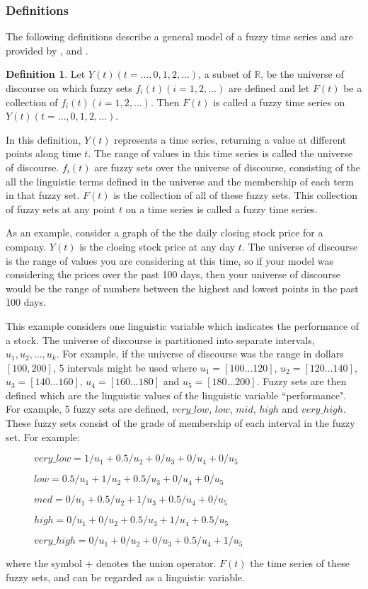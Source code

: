 \documentclass{article}
\theoremstyle{definition}
\newtheorem{ftsdef}{Definition}
\begin{document}
\subsubsection{Definitions}

The following definitions describe a general model of a fuzzy time series and are provided by \cite{song1993forecasting}, \cite{chen1996forecasting} and \cite{chu2009fuzzy}.

\begin{ftsdef}
Let $Y(t)(t= \ldots,0,1,2, \ldots)$, a subset of $\mathbb{R}$, be the universe of discourse on which fuzzy sets $f_i(t)(i=1,2,\ldots)$ are defined and let $F(t)$ be a collection of $f_i(t)(i=1,2,\ldots)$. Then $F(t)$ is called a fuzzy time series on $Y(t)(t= \ldots,0,1,2, \ldots)$.
\end{ftsdef}
In this definition, $Y(t)$ represents a time series, returning a value at different points along time $t$. The range of values in this time series is called the universe of discourse. $f_i(t)$ are fuzzy sets over the universe of discourse, consisting of the all the linguistic terms defined in the universe and the membership of each term in that fuzzy set. $F(t)$ is the collection of all of these fuzzy sets. This collection of fuzzy sets at any point $t$ on a time series is called a fuzzy time series.

As an example, consider a graph of the the daily closing stock price for a company. $Y(t)$ is the closing stock price at any day $t$. The universe of discourse is the range of values you are considering at this time, so if your model was considering the prices over the past 100 days, then your universe of discourse would be the range of numbers between the highest and lowest points in the past 100 days. 

This example considers one linguistic variable which indicates the performance of a stock. The universe of discourse is partitioned into separate intervals, $u_1, u_2,\ldots,u_k$. For example, if the universe of discourse was the range in dollars $[100, 200]$, 5 intervals might be used where $u_1 = [100 \ldots 120]$, $u_2 = [120 \ldots 140]$, $u_3 = [140 \ldots 160]$, $u_4 = [160 \ldots 180]$ and $u_5 = [180 \ldots 200]$. Fuzzy sets are then defined which are the linguistic values of the linguistic variable ``performance". For example, 5 fuzzy sets are defined, $very\_low$, $low$, $mid$, $high$ and $very\_high$. These fuzzy sets consist of the grade of membership of each interval in the fuzzy set. For example:
\begin{description}
\item[] $very\_low = 1/u_1 + 0.5/u_2 + 0/u_3 + 0/u_4 + 0/u_5$
\item[] $low = 0.5/u_1 + 1/u_2 + 0.5/u_3 + 0/u_4 + 0/u_5$
\item[] $med = 0/u_1 + 0.5/u_2 + 1/u_3 + 0.5/u_4 + 0/u_5$
\item[] $high = 0/u_1 + 0/u_2 + 0.5/u_3 + 1/u_4 + 0.5/u_5$
\item[] $very\_high = 0/u_1 + 0/u_2 + 0/u_3 + 0.5/u_4 + 1/u_5$
\end{description}
where the symbol $+$ denotes the union operator. $F(t)$ the time series of these fuzzy sets, and can be regarded as a linguistic variable.
\end{document}
